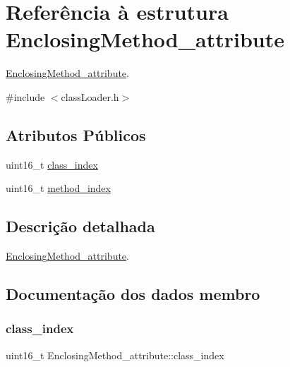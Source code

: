 \hypertarget{struct_enclosing_method__attribute}{}\section{Referência à estrutura Enclosing\+Method\+\_\+attribute}
\label{struct_enclosing_method__attribute}


\hyperlink{struct_enclosing_method__attribute}{Enclosing\+Method\+\_\+attribute}.  




{\ttfamily \#include $<$class\+Loader.\+h$>$}

\subsection*{Atributos Públicos}
\begin{DoxyCompactItemize}
\item 
uint16\+\_\+t \hyperlink{struct_enclosing_method__attribute_a0218610c5068544b37e247987fdff17f}{class\+\_\+index}
\item 
uint16\+\_\+t \hyperlink{struct_enclosing_method__attribute_a077d63409d5f2285537a02632ed1952a}{method\+\_\+index}
\end{DoxyCompactItemize}


\subsection{Descrição detalhada}
\hyperlink{struct_enclosing_method__attribute}{Enclosing\+Method\+\_\+attribute}. 

\subsection{Documentação dos dados membro}
\hypertarget{struct_enclosing_method__attribute_a0218610c5068544b37e247987fdff17f}{}\label{struct_enclosing_method__attribute_a0218610c5068544b37e247987fdff17f} 
\subsubsection{\texorpdfstring{class\+\_\+index}{class\_index}}
{\footnotesize\ttfamily uint16\+\_\+t Enclosing\+Method\+\_\+attribute\+::class\+\_\+index}

